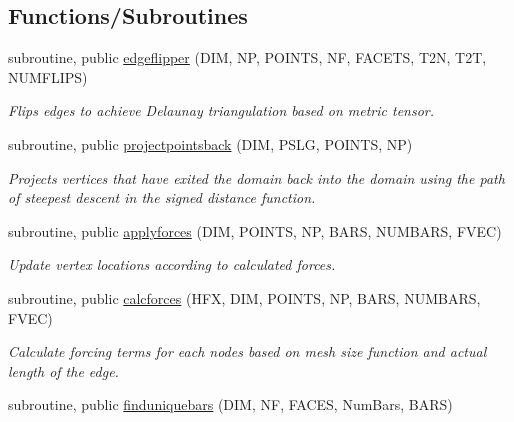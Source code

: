 \subsection*{Functions/\+Subroutines}
\begin{DoxyCompactItemize}
\item 
subroutine, public \hyperlink{namespaceutils_a5c53fe94ff412025c788ebd8d6bb66a9}{edgeflipper} (D\+IM, NP, P\+O\+I\+N\+TS, NF, F\+A\+C\+E\+TS, T2N, T2T, N\+U\+M\+F\+L\+I\+PS)
\begin{DoxyCompactList}\small\item\em Flips edges to achieve Delaunay triangulation based on metric tensor. \end{DoxyCompactList}\item 
subroutine, public \hyperlink{namespaceutils_a1e12f414c57225f806ab269ba81f43c8}{projectpointsback} (D\+IM, P\+S\+LG, P\+O\+I\+N\+TS, NP)\hypertarget{namespaceutils_a1e12f414c57225f806ab269ba81f43c8}{}\label{namespaceutils_a1e12f414c57225f806ab269ba81f43c8}

\begin{DoxyCompactList}\small\item\em Projects vertices that have exited the domain back into the domain using the path of steepest descent in the signed distance function. \end{DoxyCompactList}\item 
subroutine, public \hyperlink{namespaceutils_aa34069a7f1d2a9d87b990582219a2126}{applyforces} (D\+IM, P\+O\+I\+N\+TS, NP, B\+A\+RS, N\+U\+M\+B\+A\+RS, F\+V\+EC)\hypertarget{namespaceutils_aa34069a7f1d2a9d87b990582219a2126}{}\label{namespaceutils_aa34069a7f1d2a9d87b990582219a2126}

\begin{DoxyCompactList}\small\item\em Update vertex locations according to calculated forces. \end{DoxyCompactList}\item 
subroutine, public \hyperlink{namespaceutils_ac79fd61dca359cd697ba28f21aa0c01a}{calcforces} (H\+FX, D\+IM, P\+O\+I\+N\+TS, NP, B\+A\+RS, N\+U\+M\+B\+A\+RS, F\+V\+EC)\hypertarget{namespaceutils_ac79fd61dca359cd697ba28f21aa0c01a}{}\label{namespaceutils_ac79fd61dca359cd697ba28f21aa0c01a}

\begin{DoxyCompactList}\small\item\em Calculate forcing terms for each nodes based on mesh size function and actual length of the edge. \end{DoxyCompactList}\item 
subroutine, public \hyperlink{namespaceutils_a25387413cc319c8fc262f2455ce9523d}{finduniquebars} (D\+IM, NF, F\+A\+C\+ES, Num\+Bars, B\+A\+RS)\hypertarget{namespaceutils_a25387413cc319c8fc262f2455ce9523d}{}\label{namespaceutils_a25387413cc319c8fc262f2455ce9523d}


\end{DoxyCompactItemize}
